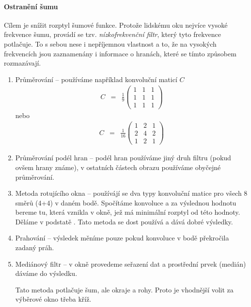 \paragraph{Ostranění šumu} 

Cílem je snížit rozptyl šumové funkce. Protože lidskému oku nejvíce  vysoké frekvence šumu, provádí
se tzv. {\em nízkofrekvenční filtr}, který tyto frekvence potlačuje. To s sebou nese i nepříjemnou vlastnost a to, že
na vysokých frekvencích jsou zaznamenány i informace o hranách, které se tímto způsobem rozmazávají.

\begin{enumerate}
\item Průměrování -- používáme například konvoluční maticí $C$
\begin{eqnarray}
C&=&\frac{1}{9}\left(\begin{array}{ccc}1&1&1\\1&1&1\\1&1&1\end{array}\right)
\end{eqnarray}
nebo
\begin{eqnarray}
C&=&\frac{1}{16}\left(\begin{array}{ccc}1&2&1\\2&4&2\\1&2&1\end{array}\right)
\end{eqnarray}

\item Průměrování podél hran -- podél hran používáme jiný druh filtru (pokud  ovšem hrany známe), 
v ostatních částech obrazu používáme obyčejné průměrování.

\item Metoda rotujícího okna -- používájí se dva typy konvoluční matice pro všech 8  směrů (4+4) v daném bodě. 
Spočítáme konvoluce a za výslednou hodnotu bereme tu, která vznikla v okně, jež má minimální rozptyl od této 
hodnoty. Děláme v podstatě . Tato metoda se dost používá a dává dobré výsledky.

\item Prahování -- výsledek měníme pouze pokud konvoluce v bodě překročila zadaný práh. 
\item Mediánový filtr -- v okně provedeme seřazení dat a prostřední prvek (medián) dáváme do výsledku. 

Tato metoda
potlačuje šum, ale  okraje a rohy. Proto je vhodnější volit za výběrové okno třeba kříž. 


\end{enumerate}
